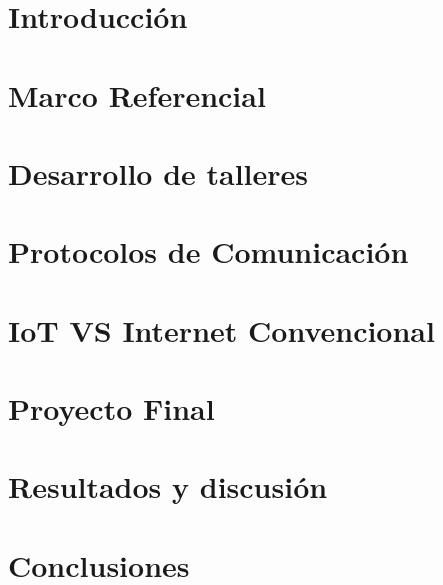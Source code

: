 \documentclass[conference]{IEEEtran}
\begin{document}
\section{Introducción}\label{sec:introduccion}
  

  

\section{Marco Referencial}\label{sec:marcoteorico} 
    

\section{Desarrollo de talleres}\label{sec:talleres}
  

\section{Protocolos de Comunicación}\label{sec:protocolosdecomunicacion}
  

\section{IoT VS Internet Convencional}\label{sec:iotvsinternet}
  

\section{Proyecto Final}\label{sec:proyectofinal}
  

\section{Resultados y discusión}\label{sec:resultados}
  

\section{Conclusiones}\label{sec:conclusiones}
  
\end{document}
